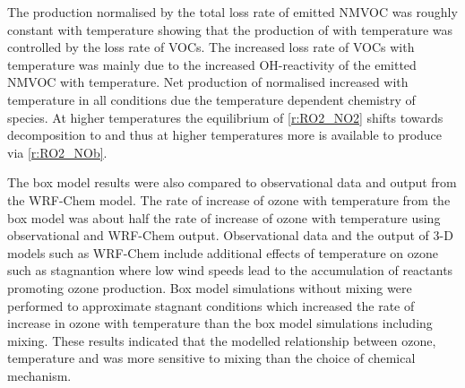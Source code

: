 The  production normalised by the total loss rate of emitted NMVOC was roughly constant with temperature showing that the production of  with temperature was controlled by the loss rate of VOCs.
The increased loss rate of VOCs with temperature was mainly due to the increased OH-reactivity of the emitted NMVOC with temperature. 
Net production of normalised  increased with temperature in all  conditions due the temperature dependent chemistry of  species.
At higher temperatures the equilibrium of  \eqref{r:RO2_NO2} shifts towards decomposition to  and  thus at higher temperatures more  is available to produce  via \eqref{r:RO2_NOb}.

The box model results were also compared to observational data and output from the WRF-Chem model.
The rate of increase of ozone with temperature from the box model was about half the rate of increase of ozone with temperature using observational and WRF-Chem output.
Observational data and the output of 3-D models such as WRF-Chem include additional effects of temperature on ozone such as stagnantion where low wind speeds lead to the accumulation of reactants promoting ozone production.
Box model simulations without mixing were performed to approximate stagnant conditions which increased the rate of increase in ozone with temperature than the box model simulations including mixing.
These results indicated that the modelled relationship between ozone, temperature and  was more sensitive to mixing than the choice of chemical mechanism.
